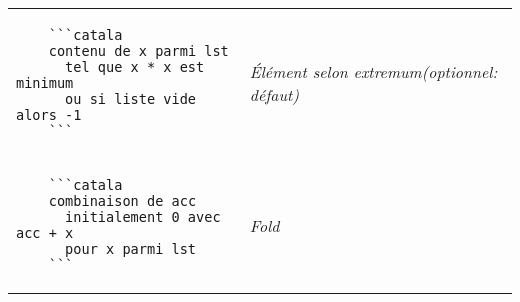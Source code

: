 \documentclass{article}
\makeatletter
\newenvironment{catala}{%
  \VerbatimEnvironment
  \let\FV@ListVSpace\relax
  \begin{verbatim}}%
 {\end{verbatim}}
\makeatother
\begin{document}
\begin{multicols}{3}
\begin{tabular}{@{}p{\cola}>{\slshape}p{\colb}@{}}
  \\
  \begin{catala}
    ```catala
    contenu de x parmi lst
      tel que x * x est minimum
      ou si liste vide alors -1
    ```
  \end{catala}
  & Élément selon extremum\newline (optionnel: défaut)
  \\
  \begin{catala}
    ```catala
    combinaison de acc
      initialement 0 avec acc + x
      pour x parmi lst
    ```
  \end{catala}
  & Fold
  \\
\end{tabular}

\end{multicols}
\end{document}
